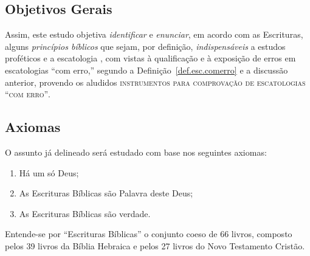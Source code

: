     \subsection{Objetivos Gerais}

    Assim, este estudo objetiva \emph{identificar} e \emph{enunciar}, em  acordo  com  as  Escrituras,  alguns  \emph{princípios
    bíblicos} que sejam, por definição, \emph{indispensáveis} a estudos proféticos e a escatologia  ,  com
    vistas à qualificação e à exposição de erros em escatologias ``com erro,'' segundo  a  Definição~\ref{def.esc.comerro}  e  a
    discussão anterior, provendo os aludidos \textsc{instrumentos para comprovação de escatologias ``com erro''}.


    \subsection{Axiomas}

    O assunto já delineado será estudado com base nos seguintes axiomas:

    \begin{enumerate}

        \item\label{ax:Deus.exis} Há um só Deus;

        \item\label{ax:Escr.pala} As Escrituras Bíblicas são Palavra deste Deus;

        \item\label{ax:Deus.verd} As Escrituras Bíblicas são verdade.

    \end{enumerate}

    Entende-se por ``Escrituras Bíblicas'' o conjunto coeso de 66 livros, composto pelos 39 livros da Bíblia Hebraica e pelos 27
    livros do Novo Testamento Cristão.




